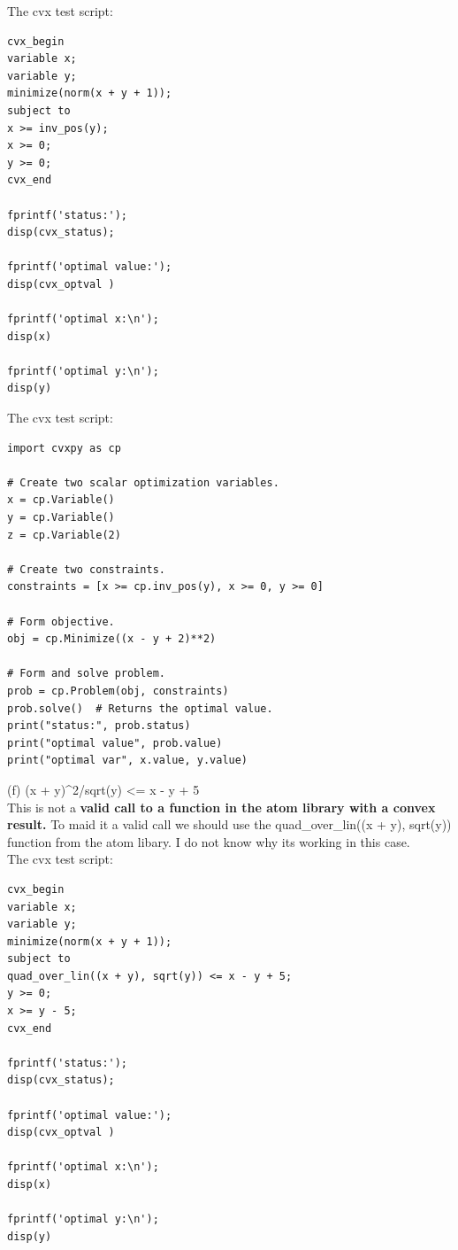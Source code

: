 \documentclass{article}
\begin{document}
The cvx test script:
\begin{verbatim}
cvx_begin
variable x;
variable y;
minimize(norm(x + y + 1));
subject to
x >= inv_pos(y); 
x >= 0; 
y >= 0;
cvx_end

fprintf('status:'); 
disp(cvx_status);

fprintf('optimal value:'); 
disp(cvx_optval )

fprintf('optimal x:\n'); 
disp(x)

fprintf('optimal y:\n'); 
disp(y)
\end{verbatim}

The cvx test script:
\begin{verbatim}
import cvxpy as cp

# Create two scalar optimization variables.
x = cp.Variable()
y = cp.Variable()
z = cp.Variable(2)

# Create two constraints.
constraints = [x >= cp.inv_pos(y), x >= 0, y >= 0]

# Form objective.
obj = cp.Minimize((x - y + 2)**2)

# Form and solve problem.
prob = cp.Problem(obj, constraints)
prob.solve()  # Returns the optimal value.
print("status:", prob.status)
print("optimal value", prob.value)
print("optimal var", x.value, y.value)
\end{verbatim}

(f) (x + y)\^{}2/sqrt(y) \textless= x - y + 5\\

This is not a \textbf{valid call to a function in the atom library with a convex result.} To maid it a valid call we should use the 
quad\_over\_lin((x + y), sqrt(y)) function from the atom libary. I do not know why its working in this case.\\

The cvx test script:\\
\begin{verbatim}
cvx_begin
variable x;
variable y;
minimize(norm(x + y + 1));
subject to
quad_over_lin((x + y), sqrt(y)) <= x - y + 5;
y >= 0;
x >= y - 5;
cvx_end

fprintf('status:'); 
disp(cvx_status);

fprintf('optimal value:'); 
disp(cvx_optval )

fprintf('optimal x:\n'); 
disp(x)

fprintf('optimal y:\n'); 
disp(y)
\end{verbatim}
\end{document}
